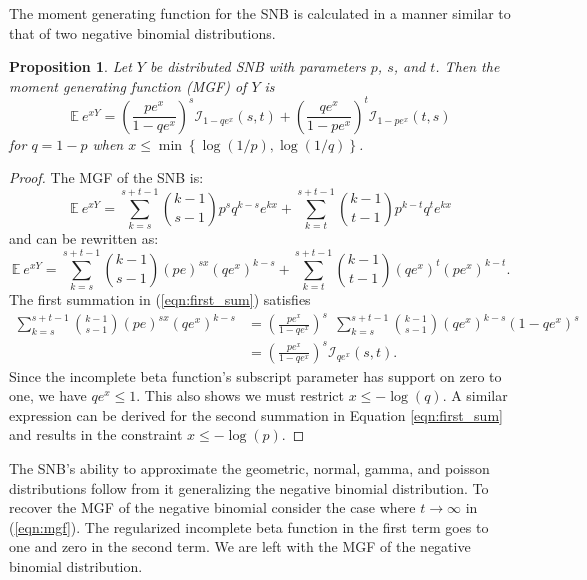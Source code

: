 \documentclass[review]{elsarticle}
\newtheorem{prop}{Proposition}
\begin{document}
The moment generating function for the SNB is calculated in a manner similar to 
that of two negative binomial distributions. 
\begin{prop} Let $Y$ be distributed SNB with parameters $p$, $s$, and $t$.
Then the moment generating function (MGF) of $Y$ is
\begin{equation} \label{eqn:mgf}
\mathbb{E}~e^{xY} = \left(\frac{p e^x}{1 - qe^x}\right)^s 
  \mathcal{I}_{1-qe^x} (s, t) + \left(\frac{qe^x}{1-pe^x}\right)^t 
  \mathcal{I}_{1-pe^x}(t, s)
\end{equation}
for $q = 1-p$ when $x \leq \min \left\{\log(1/p), \log(1/q) \right\}$.
\end{prop}
\begin{proof}
The MGF of the SNB is:
\begin{equation*}
\mathbb{E}~e^{xY} = \sum_{k=s}^{s+t-1} {k-1 \choose s-1} p^s q^{k-s} e^{kx} 
  + \sum_{k=t}^{s+t-1} {k-1 \choose t-1} p^{k-t} q^t e^{kx}
\end{equation*}
and can be rewritten as:
\begin{equation} \label{eqn:first_sum}
\mathbb{E}~e^{xY} = \sum_{k=s}^{s+t-1}{k-1 \choose s-1} (pe)^{sx} (qe^x)^{k-s} 
  + \sum_{k=t}^{s+t-1}{k-1 \choose t-1} (qe^x)^t (pe^x)^{k-t}.
\end{equation}
The first summation in (\ref{eqn:first_sum}) satisfies
\begin{align*}
\sum_{k=s}^{s+t-1}{k-1 \choose s-1} (pe)^{sx} (qe^x)^{k-s} &= 
  \left(\frac{pe^x}{1 - qe^x}\right)^s \ \ \sum_{k=s}^{s+t-1} {k-1 \choose s-1} 
    (qe^x)^{k-s} (1-qe^x)^s \\
  &= \left(\frac{pe^x}{1 - qe^x}\right)^s \mathcal{I}_{qe^x}(s, t).
\end{align*}
Since the incomplete beta function's subscript parameter has support on zero 
to one, we have $qe^x \leq 1$. This also shows we must restrict
$x \leq -\log(q)$.
A similar expression can be derived for the second summation in 
Equation \ref{eqn:first_sum} and results in
the constraint $x \leq -\log(p)$.
\end{proof}

The SNB's ability to approximate the geometric, normal, gamma, and poisson
distributions follow from it generalizing the negative binomial distribution. 
To recover the MGF of the negative binomial consider the case where
$t \rightarrow \infty$ in (\ref{eqn:mgf}). The regularized incomplete
beta function in the first term goes to one and zero in the second term.
We are left with the MGF of the negative binomial distribution. 
\end{document}
